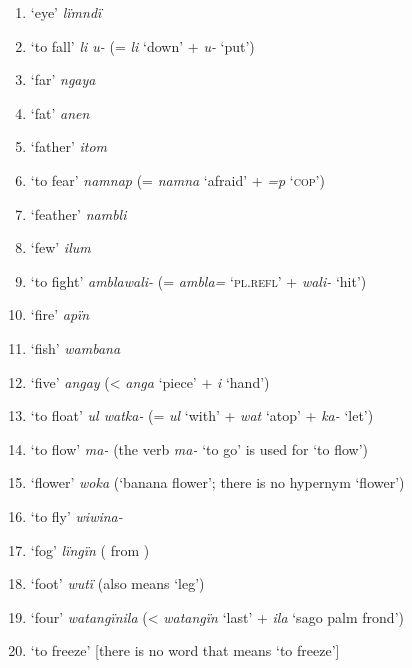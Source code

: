 \begin{enumerate}[noitemsep, label={\arabic*}, align=left, widest=190, labelsep=1ex,leftmargin=*]
\item ‘eye’ \textit{lïmndï}

\item ‘to fall’ \textit{li u-} (= \textit{li} ‘down’ + \textit{u-} ‘put’)

\item ‘far’ \textit{ngaya}

\item ‘fat’ \textit{anen}

\item ‘father’ \textit{itom}

\item ‘to fear’ \textit{namnap} (= \textit{namna} ‘afraid’ + \textit{=p} ‘\textsc{cop}’)

\item ‘feather’ \textit{nambli}

\item ‘few’ \textit{ilum}

\item ‘to fight’ \textit{amblawali-} (= \textit{ambla=} ‘\textsc{pl.refl}’ + \textit{wali-} ‘hit’)

\item ‘fire’ \textit{apïn}

\item ‘fish’ \textit{wambana}

\item ‘five’ \textit{angay} (< \textit{anga} ‘piece’ + \textit{i} ‘hand’)

\item ‘to float’ \textit{ul watka-} (= \textit{ul} ‘with’ + \textit{wat} ‘atop’ + \textit{ka-} ‘let’)

\item ‘to flow’ \textit{ma-} (the verb \textit{ma-} ‘to go’ is used for ‘to flow’)

\item ‘flower’ \textit{woka} (‘banana flower’; there is no hypernym ‘flower’)

\item ‘to fly’ \textit{wiwina-}

\item ‘fog’ \textit{lïngïn} ( from )

\item ‘foot’ \textit{wutï} (also means ‘leg’)

\item ‘four’ \textit{watangïnila} (< \textit{watangïn} ‘last’ + \textit{ila} ‘sago palm frond’)

\item ‘to freeze’ [there is no word that means ‘to freeze’]


\end{enumerate}
